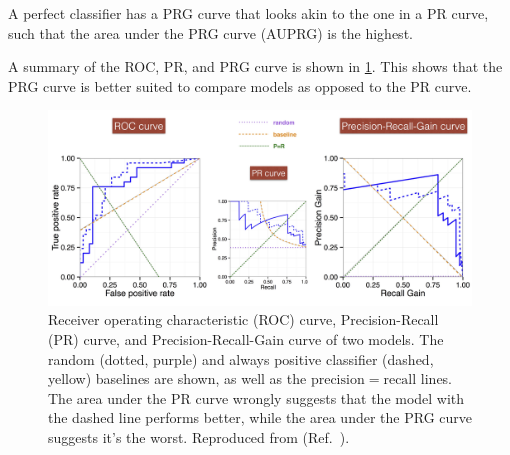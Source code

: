 A perfect classifier has a PRG curve that looks akin to the one in a PR curve, such that the area under the PRG curve (AUPRG) is the highest.

A summary of the ROC, PR, and PRG curve is shown in \cref{fig:roc-pr-prg-curve}.
This shows that the PRG curve is better suited to compare models as opposed to the PR curve.

\begin{figure}
    \centering
    \includegraphics[width=\linewidth]{pediatric-brain-tumours/images/roc-pr-prg-curves.jpg}
    \caption[ROC, PR, and PRG curve comparison]{
        Receiver operating characteristic (ROC) curve, Precision-Recall (PR) curve, and Precision-Recall-Gain curve of two models.
        The random (dotted, purple) and always positive classifier (dashed, yellow) baselines are shown, as well as the $\mathrm{precision} = \mathrm{recall}$ lines.
        The area under the PR curve wrongly suggests that the model with the dashed line performs better, while the area under the PRG curve suggests it's the worst.
        Reproduced from  (Ref.~\cite{Flach2015}).
    }
    \label{fig:roc-pr-prg-curve}
\end{figure}





